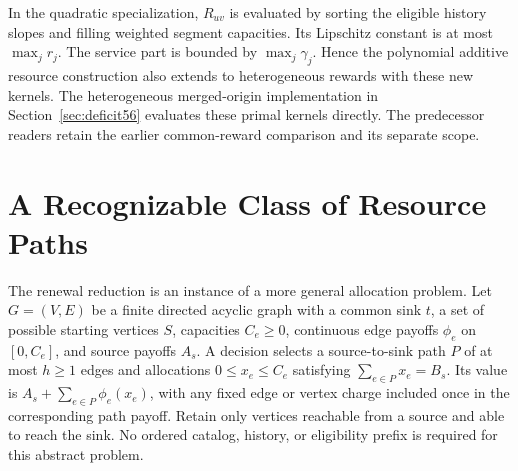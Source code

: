 \documentclass[11pt,letterpaper]{article}
\theoremstyle{definition}\newtheorem{remark}[theorem]{Remark}
\begin{document}
In the quadratic specialization, $R_{uv}$ is evaluated by sorting the eligible history slopes and filling weighted segment capacities. Its Lipschitz constant is at most $\max_j r_j$. The service part is bounded by $\max_j\gamma_j$. Hence the polynomial additive resource construction also extends to heterogeneous rewards with these new kernels. The heterogeneous merged-origin implementation in Section~\ref{sec:deficit56} evaluates these primal kernels directly. The predecessor readers retain the earlier common-reward comparison and its separate scope.
\section{A Recognizable Class of Resource Paths}\label{sec:class59}
The renewal reduction is an instance of a more general allocation problem. Let $G=(V,E)$ be a finite directed acyclic graph with a common sink $t$, a set of possible starting vertices $S$, capacities $C_e\geq0$, continuous edge payoffs $\phi_e$ on $[0,C_e]$, and source payoffs $A_s$. A decision selects a source-to-sink path $P$ of at most $h\geq1$ edges and allocations $0\leq x_e\leq C_e$ satisfying $\sum_{e\in P}x_e=B_s$. Its value is $A_s+\sum_{e\in P}\phi_e(x_e)$, with any fixed edge or vertex charge included once in the corresponding path payoff. Retain only vertices reachable from a source and able to reach the sink. No ordered catalog, history, or eligibility prefix is required for this abstract problem.
\end{document}
